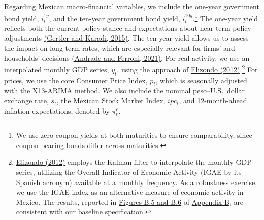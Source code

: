 \documentclass[12pt, reqno]{article}
\begin{document}
Regarding Mexican macro-financial variables, we include the one-year government bond yield, $i_t^{1y}$, and the ten-year government bond yield, $i_t^{10y}$.\footnote{We use zero-coupon yields at both maturities to ensure comparability, since coupon-bearing bonds differ across maturities.} The one-year yield reflects both the current policy stance and expectations about near-term policy adjustments \hyperlink{Gertler and Karadi (2015)}{(Gertler and Karadi, 2015)}. The ten-year yield allows us to assess the impact on long-term rates, which are especially relevant for firms’ and households’ decisions \hyperlink{Andrade and Ferroni (2021)}{(Andrade and Ferroni, 2021)}. For real activity, we use an interpolated monthly GDP series, $y_t$, using the approach of \hyperlink{Elizondo (2012)}{Elizondo (2012)}.\footnote{\hyperlink{Elizondo (2012)}{Elizondo (2012)} employs the Kalman filter to interpolate the monthly GDP series, utilizing the Overall Indicator of Economic Activity (IGAE  by  its  Spanish  acronym) available at a monthly frequency. As a robustness exercise, we use the IGAE index as an alternative
measure of economic activity in Mexico. The results, reported in \hyperlink{Figure B.5}{Figures B.5 and B.6} of \hyperlink{Appendix B}{Appendix B}, are consistent with our baseline specification.} For prices, we use the core Consumer Price Index, $p_t$, which is seasonally adjusted with the X13-ARIMA method. We also include the nominal peso--U.S.\ dollar exchange rate, $s_t$, the Mexican Stock Market Index, $ipc_t$, and 12-month-ahead inflation expectations, denoted by $\pi^{e}_{t}$.
\end{document}
